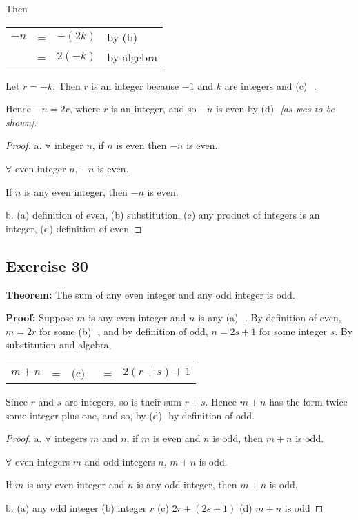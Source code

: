 \documentclass[14pt]{extarticle}
\newcommand{\fbl}{\underline{\hspace{1cm}}\,\,}
\newcommand{\fa}{\forall}
\newcommand{\cy}{\color{cyan}}
\begin{document}
Then

\begin{center}
    \begin{tabular}{rcll}
        $-n$ & = & $-(2k)$ & \cy by (b) \fbl \\
             & = & $2(-k)$ & \cy by algebra  \\
    \end{tabular}
\end{center}

Let $r = -k$. Then $r$ is an integer because $-1$ and $k$ are integers and {\cy (c)} \fbl.

Hence $-n = 2r$, where $r$ is an integer, and so $-n$ is even by {\cy (d)} \fbl {\it [as was to be shown]}.

\begin{proof}
    a. $\fa$ integer $n$, if $n$ is even then $-n$ is even.

    $\fa$ even integer $n$, $-n$ is even.

    If $n$ is any even integer, then $-n$ is even.

    b. (a) definition of even, (b) substitution, (c) any product of integers is an integer, (d) definition of even
\end{proof}

\subsection{Exercise 30}
{\bf Theorem:} The sum of any even integer and any odd integer is odd.

    {\bf Proof:} Suppose $m$ is any even integer and $n$ is any {\cy (a)} \fbl. By definition of even, $m = 2r$ for some {\cy (b)} \fbl, and by definition of odd, $n = 2s + 1$ for some integer $s$. By substitution and algebra,

\begin{center}
    \begin{tabular}{ccccc}
        $m+n$ & = & {\cy (c)} \fbl & = & $2(r+s)+1$ \\
    \end{tabular}
\end{center}

Since $r$ and $s$ are integers, so is their sum $r+s$. Hence $m+n$ has the form twice some integer plus one, and so, by {\cy (d)} \fbl by definition of odd.

\begin{proof}
    a. $\fa$ integers $m$ and $n$, if $m$ is even and $n$ is odd, then $m + n$ is odd.

    $\fa$ even integers $m$ and odd integers $n$, $m + n$ is odd.

    If $m$ is any even integer and $n$ is any odd integer,
    then $m + n$ is odd.

    b. (a) any odd integer (b) integer $r$ (c) $2r + (2s + 1)$ (d) $m + n$ is odd
\end{proof}
\end{document}
